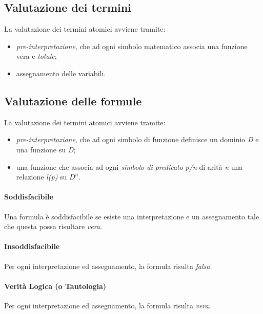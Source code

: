 \subsection{Valutazione dei termini}
La valutazione dei termini atomici avviene tramite:
\begin{itemize}
	\item \textit{pre-interpretazione}, che ad ogni simbolo matematico associa una funzione vera e \textit{totale};
	\item assegnamento delle variabili.
\end{itemize}

\subsection{Valutazione delle formule}
La valutazione dei termini atomici avviene tramite:
\begin{itemize}
	\item \textit{pre-interpretazione}, che ad ogni simbolo di funzione definisce un dominio \textit{D} e una funzione su \textit{D};
	\item una funzione che associa ad ogni \textit{simbolo di predicato} \textit{p/n} di arità \textit{n} una relazione \textit{l(p)} su $D^n$.
\end{itemize}

\paragraph{Soddisfacibile}
Una formula è soddisfacibile se esiste una interpretazione e un assegnamento tale che questa possa risultare \textit{vera}.
\paragraph{Insoddisfacibile}
Per ogni interpretazione ed assegnamento, la formula risulta \textit{falsa}.
\paragraph{Verità Logica (o Tautologia)}
Per ogni interpretazione ed assegnamento, la formula risulta \textit{vera}.
